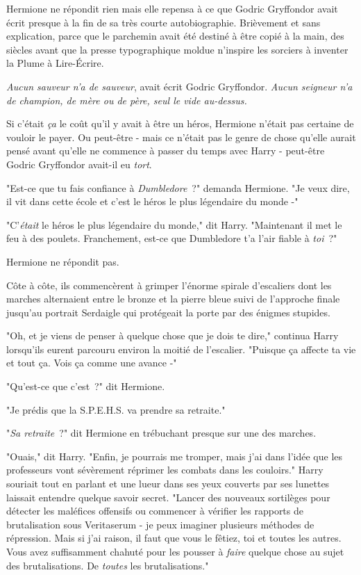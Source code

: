 Hermione ne répondit rien mais elle repensa à ce que Godric Gryffondor avait écrit presque à la fin de sa très courte autobiographie. Brièvement et sans explication, parce que le parchemin avait été destiné à être copié à la main, des siècles avant que la presse typographique moldue n'inspire les sorciers à inventer la Plume à Lire-Écrire.

\emph{Aucun sauveur n'a de sauveur}, avait écrit Godric Gryffondor. \emph{Aucun seigneur n'a de champion, de mère ou de père, seul le vide au-dessus.}

Si c'était \emph{ça} le coût qu'il y avait à être un héros, Hermione n'était pas certaine de vouloir le payer. Ou peut-être - mais ce n'était pas le genre de chose qu'elle aurait pensé avant qu'elle ne commence à passer du temps avec Harry - peut-être Godric Gryffondor avait-il eu \emph{tort}.

"Est-ce que tu fais confiance à \emph{Dumbledore}~?" demanda Hermione. "Je veux dire, il vit dans cette école et c'est le héros le plus légendaire du monde -"

"C'\emph{était} le héros le plus légendaire du monde," dit Harry. "Maintenant il met le feu à des poulets. Franchement, est-ce que Dumbledore t'a l'air fiable à \emph{toi}~?"

Hermione ne répondit pas.

Côte à côte, ils commencèrent à grimper l'énorme spirale d'escaliers dont les marches alternaient entre le bronze et la pierre bleue suivi de l'approche finale jusqu'au portrait Serdaigle qui protégeait la porte par des énigmes stupides.

"Oh, et je viens de penser à quelque chose que je dois te dire," continua Harry lorsqu'ils eurent parcouru environ la moitié de l'escalier. "Puisque ça affecte ta vie et tout ça. Vois ça comme une avance -"

"Qu'est-ce que c'est~?" dit Hermione.

"Je prédis que la S.P.E.H.S. va prendre sa retraite."

"\emph{Sa retraite}~?" dit Hermione en trébuchant presque sur une des marches.

"Ouais," dit Harry. "Enfin, je pourrais me tromper, mais j'ai dans l'idée que les professeurs vont sévèrement réprimer les combats dans les couloirs." Harry souriait tout en parlant et une lueur dans ses yeux couverts par ses lunettes laissait entendre quelque savoir secret. "Lancer des nouveaux sortilèges pour détecter les maléfices offensifs ou commencer à vérifier les rapports de brutalisation sous Veritaserum - je peux imaginer plusieurs méthodes de répression. Mais si j'ai raison, il faut que vous le fêtiez, toi et toutes les autres. Vous avez suffisamment chahuté pour les pousser à \emph{faire} quelque chose au sujet des brutalisations. De \emph{toutes} les brutalisations."

